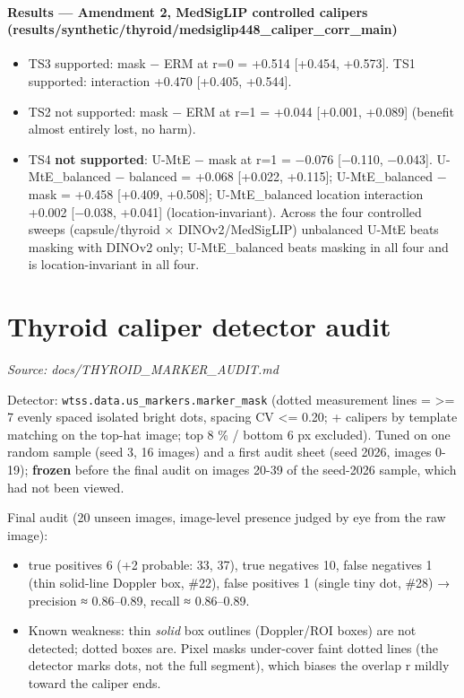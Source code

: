 {\paragraph{Results --- Amendment 2, MedSigLIP controlled calipers (results/synthetic/thyroid/medsiglip448\_caliper\_corr\_main)}\label{results--amendment-2-medsiglip-controlled-calipers-resultssyntheticthyroidmedsiglip448_caliper_corr_main}

\begin{itemize}

\item
  TS3 supported: mask − ERM at r=0 = +0.514 {[}+0.454, +0.573{]}. TS1 supported: interaction +0.470 {[}+0.405, +0.544{]}.
\item
  TS2 not supported: mask − ERM at r=1 = +0.044 {[}+0.001, +0.089{]} (benefit almost entirely lost, no harm).
\item
  TS4 \textbf{not supported}: U-MtE − mask at r=1 = −0.076 {[}−0.110, −0.043{]}. U-MtE\_balanced − balanced = +0.068
  {[}+0.022, +0.115{]}; U-MtE\_balanced − mask = +0.458 {[}+0.409, +0.508{]}; U-MtE\_balanced location interaction +0.002
  {[}−0.038, +0.041{]} (location-invariant).
  Across the four controlled sweeps (capsule/thyroid × DINOv2/MedSigLIP) unbalanced U-MtE beats masking with DINOv2
  only; U-MtE\_balanced beats masking in all four and is location-invariant in all four.
\end{itemize}

}

\section{Thyroid caliper detector audit}\label{doc:THYROID_MARKER_AUDIT}
\noindent\textit{Source: docs/THYROID\_MARKER\_AUDIT.md}

{\small
Detector: \texttt{wtss.data.us\_markers.marker\_mask} (dotted measurement lines = \textgreater= 7 evenly spaced isolated bright dots,
spacing CV \textless= 0.20; \textquotesingle+\textquotesingle{} calipers by template matching on the top-hat image; top 8 \% / bottom 6 px excluded).
Tuned on one random sample (seed 3, 16 images) and a first audit sheet (seed 2026, images 0-19); \textbf{frozen}
before the final audit on images 20-39 of the seed-2026 sample, which had not been viewed.

Final audit (20 unseen images, image-level presence judged by eye from the raw image):

\begin{itemize}

\item
  true positives 6 (+2 probable: 33, 37), true negatives 10, false negatives 1 (thin solid-line Doppler box, \#22),
  false positives 1 (single tiny dot, \#28) → precision ≈ 0.86--0.89, recall ≈ 0.86--0.89.
\item
  Known weakness: thin \emph{solid} box outlines (Doppler/ROI boxes) are not detected; dotted boxes are.
  Pixel masks under-cover faint dotted lines (the detector marks dots, not the full segment), which biases the
  overlap r mildly toward the caliper ends.
\end{itemize}

}

